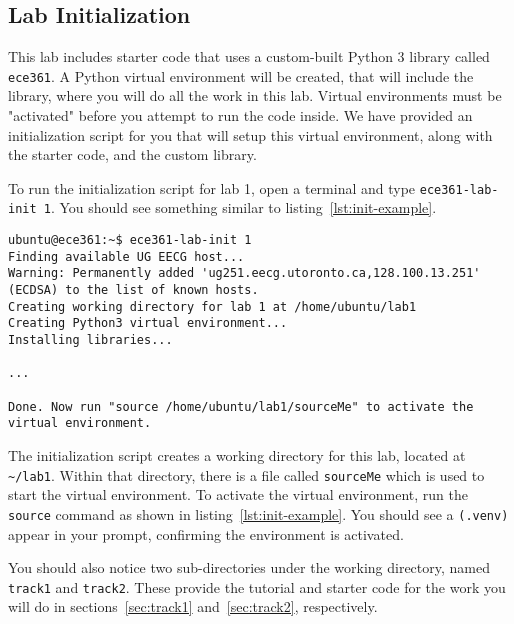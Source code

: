 \documentclass[11pt]{article}
\def\thelab{1}
\begin{document}
\subsection{Lab Initialization}
\label{subsec:lab-init}
This lab includes starter code that uses a custom-built Python 3 library called \texttt{ece361}. A Python virtual environment will be created, that will include the library, where you will do all the work in this lab. Virtual environments must be "activated" before you attempt to run the code inside. We have provided an initialization script for you that will setup this virtual environment, along with the starter code, and the custom library.


To run the initialization script for lab \thelab, open a terminal and type \texttt{ece361-lab-init \thelab}. You should see something similar to listing~\ref{lst:init-example}.
\begin{lstlisting}[style=ece361shell, caption={Initializing lab \thelab}, label={lst:init-example}]
ubuntu@ece361:~$ ece361-lab-init 1
Finding available UG EECG host...
Warning: Permanently added 'ug251.eecg.utoronto.ca,128.100.13.251' (ECDSA) to the list of known hosts.
Creating working directory for lab 1 at /home/ubuntu/lab1
Creating Python3 virtual environment...
Installing libraries...

...

Done. Now run "source /home/ubuntu/lab1/sourceMe" to activate the virtual environment.
\end{lstlisting}

The initialization script creates a working directory for this lab, located at \texttt{\textasciitilde/lab1}.
Within that directory, there is a file called \texttt{sourceMe} which is used to start the virtual environment.
To activate the virtual environment, run the \texttt{source} command as shown in listing~\ref{lst:init-example}.
You should see a \texttt{(.venv)} appear in your prompt, confirming the environment is activated.

You should also notice two sub-directories under the working directory, named \texttt{track1} and \texttt{track2}. These provide the tutorial and starter code for the work you will do in sections~\ref{sec:track1} and~\ref{sec:track2}, respectively.
\end{document}
